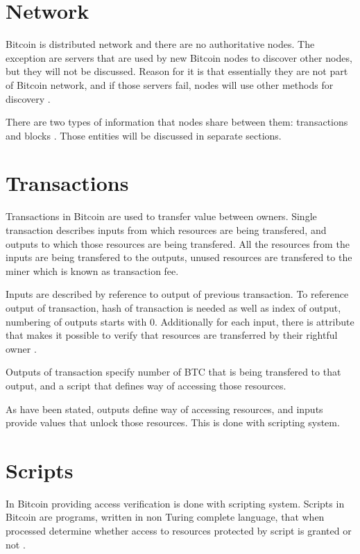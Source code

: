 \documentclass[12pt, en, eng, oneside, final]{mgr}
\begin{document}
\section{Network}
Bitcoin is distributed network and there are no authoritative nodes. The exception are servers that are used by new Bitcoin nodes to discover other nodes, but they will not be discussed. Reason for it is that essentially they are not part of Bitcoin network, and if those servers fail, nodes will use other methods for discovery \cite{bitcoin-paper-1}.

There are two types of information that nodes share between them: transactions and blocks \cite{bitcoin-paper-1}. Those entities will be discussed in separate sections.

\section{Transactions}
Transactions in Bitcoin are used to transfer value between owners. Single transaction describes inputs from which resources are being transfered, and outputs to which those resources are being transfered. All the resources from the inputs are being transfered to the outputs, unused resources are transfered to the miner which is known as transaction fee.

Inputs are described by reference to output of previous transaction. To reference output of transaction, hash of transaction is needed as well as index of output, numbering of outputs starts with 0. Additionally for each input, there is attribute that makes it possible to verify that resources are transferred by their rightful owner \cite{bitcoin-transaction}.

Outputs of transaction specify number of BTC that is being transfered to that output, and a script that defines way of accessing those resources. 

As have been stated, outputs define way of accessing resources, and inputs provide values that unlock those resources. This is done with scripting system.

\section{Scripts}
In Bitcoin providing access verification is done with scripting system. Scripts in Bitcoin are programs, written in non Turing complete language, that when processed determine whether access to resources protected by script is granted or not \cite{bitcoin-script}.
\end{document}
